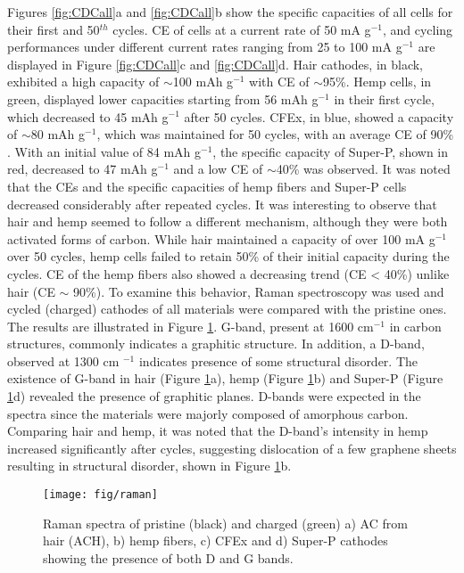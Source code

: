 \documentclass{article}
\begin{document}
Figures \ref{fig:CDCall}a and \ref{fig:CDCall}b show the specific capacities of all cells for their first and 50$^{th}$ cycles. CE of cells at a current rate of 50 mA g$^{-1}$, and cycling performances under different current rates ranging from 25 to 100 mA g$^{-1}$ are displayed in Figure \ref{fig:CDCall}c and \ref{fig:CDCall}d. Hair cathodes, in black, exhibited a high capacity of $\sim$100 mAh g$^{-1}$ with CE of $\sim$95\%. Hemp cells, in green, displayed lower capacities starting from 56 mAh g$^{-1}$ in their first cycle, which decreased to 45 mAh g$^{-1}$ after 50 cycles. CFEx, in blue, showed a capacity of $\sim$80 mAh g$^{-1}$, which was maintained for 50 cycles, with an average CE of 90\% . With an initial value of 84 mAh g$^{-1}$, the specific capacity of Super-P, shown in red, decreased to 47 mAh g$^{-1}$ and a low CE of $\sim$40\% was observed. It was noted that the CEs and the specific capacities of hemp fibers and Super-P cells decreased considerably after repeated cycles. 
It was interesting to observe that hair and hemp seemed to follow a different mechanism, although they were both activated forms of carbon. While hair maintained a capacity of over 100 mA g$^{-1}$ over 50 cycles, hemp cells failed to retain 50\% of their initial capacity during the cycles. CE of the hemp fibers also showed a decreasing trend (CE < 40\%) unlike hair (CE $\sim$ 90\%). To examine this behavior, Raman spectroscopy was used and cycled (charged) cathodes of all materials were compared with the pristine ones. The results are illustrated in Figure \ref{fig:raman}. G-band, present at 1600 cm$^{-1}$ in carbon structures, commonly indicates a graphitic structure. In addition, a D-band, observed at 1300 cm $^{-1}$ indicates presence of some structural disorder. The existence of G-band in hair (Figure \ref{fig:raman}a), hemp (Figure \ref{fig:raman}b) and Super-P (Figure \ref{fig:raman}d) revealed the presence of graphitic planes. D-bands were expected in the spectra since the materials were majorly composed of amorphous carbon. Comparing hair and hemp, it was noted that the D-band's intensity in hemp increased significantly after cycles, suggesting dislocation of a few graphene sheets resulting in structural disorder, shown in Figure \ref{fig:raman}b. 

\begin{figure}
  \centering
  \texttt{[image: fig/raman]}
    \caption{Raman spectra of pristine (black) and charged (green) a) AC from hair (ACH), b) hemp fibers, c) CFEx and d) Super-P cathodes showing the presence of both D and G bands.}
  \label{fig:raman}
\end{figure}
\end{document}
